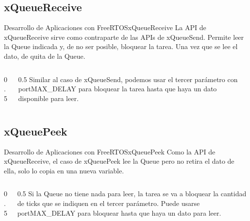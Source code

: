 \documentclass[aspectratio=169, xcolor=dvipsnames]{beamer}
\begin{document}
\subsection{xQueueReceive}
\begin{frame}{Desarrollo de Aplicaciones con FreeRTOS}{xQueueReceive}
La API de \textcolor{myblue}{xQueueReceive} sirve como contraparte de las APIs de xQueueSend. Permite leer la Queue indicada y, de no ser posible, bloquear la tarea. Una vez que se lee el dato, de quita de la Queue.\newline
\begin{columns}
\begin{column}{0.5\textwidth}

\end{column}
\begin{column}{0.5\textwidth}
Similar al caso de xQueueSend, podemos usar el tercer parámetro con \textcolor{myblue}{portMAX\_DELAY} para bloquear la tarea hasta que haya un dato disponible para leer.
\end{column}
\end{columns}
\end{frame}

\subsection{xQueuePeek}
\begin{frame}{Desarrollo de Aplicaciones con FreeRTOS}{xQueuePeek}
Como la API de xQueueReceive, el caso de \textcolor{myblue}{xQueuePeek} lee la Queue pero no retira el dato de ella, solo lo copia en una nueva variable.\newline
\begin{columns}
\begin{column}{0.5\textwidth}

\end{column}
\begin{column}{0.5\textwidth}
Si la Queue no tiene nada para leer, la tarea se va a bloquear la cantidad de ticks que se indiquen en el tercer parámetro. Puede usarse \textcolor{myblue}{portMAX\_DELAY} para bloquear hasta que haya un dato para leer.
\end{column}
\end{columns}
\end{frame}
\end{document}
